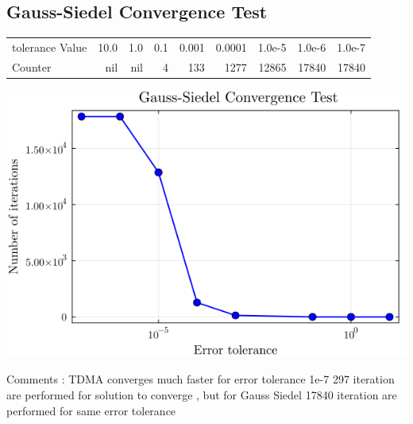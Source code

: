 \documentclass[11pt,twocolumn]{article}
\begin{document}
\subsection{Gauss-Siedel Convergence Test}
\label{sec:orge8d958a}

\begin{center}
\begin{tabular}{lrrrrrrrr}
tolerance Value & 10.0 & 1.0 & 0.1 & 0.001 & 0.0001 & 1.0e-5 & 1.0e-6 & 1.0e-7\\
Counter & nil & nil & 4 & 133 & 1277 & 12865 & 17840 & 17840\\
\end{tabular}
\end{center}

\begin{center}
\includegraphics[width=.9\linewidth]{./conv1.png}
\end{center}

Comments : TDMA converges much faster for error tolerance 1e-7 297 iteration are performed for solution to converge , but for Gauss Siedel 17840 iteration are performed for same error tolerance   
\end{document}

